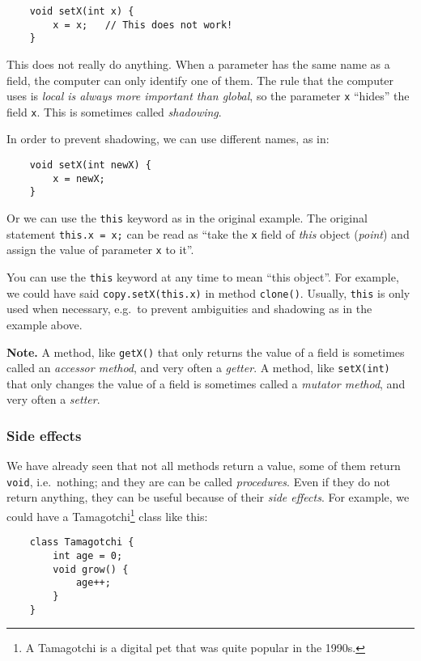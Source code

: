 \begin{verbatim}
    void setX(int x) {
        x = x;   // This does not work!
    }
\end{verbatim}

This does not really do anything. When a parameter has the same name
as a field, the computer can only identify one of them. The rule that
the computer uses is \emph{local is always more important than
  global}, so the parameter \verb+x+ ``hides'' the field
\verb+x+. This is sometimes called \emph{shadowing}. 

In order to prevent shadowing, we can use different names, as in: 

\begin{verbatim}
    void setX(int newX) {
        x = newX;
    }
\end{verbatim}

Or we can use the \verb+this+ keyword as in the original example. The
original statement \verb+this.x = x;+ can be read as ``take the
\verb+x+ field of \emph{this} object (\emph{point}) and
assign the value of parameter \verb+x+ to it''. 

You can use the \verb+this+ keyword at any time to mean ``this
object''. For example, we could have said \verb+copy.setX(this.x)+ in
method \verb+clone()+. Usually, \verb+this+ is only used when necessary,
e.g.~to prevent ambiguities and shadowing as in the example above. 

\textbf{Note.} A method, like \verb+getX()+ that only returns the
value of a field is 
sometimes called an \emph{accessor method}, and very often a
\emph{getter}. A method, 
like \verb+setX(int)+ that only changes the
value of a field is 
sometimes called a \emph{mutator method}, and very often a
\emph{setter}. 

\subsubsection*{Side effects}
\label{sec:side-effects}

We have already seen that not all methods return a value, some of them
return \verb+void+, i.e.~nothing; and they are can be called
\emph{procedures}. Even if they do not return anything, they can be useful
because of their \emph{side effects}. For example, we could have a
Tamagotchi\footnote{A Tamagotchi is a digital pet that was quite
  popular in the 1990s.} class like this: 

\begin{verbatim}
    class Tamagotchi {
        int age = 0;
        void grow() {
            age++;
        }
    }
\end{verbatim}

